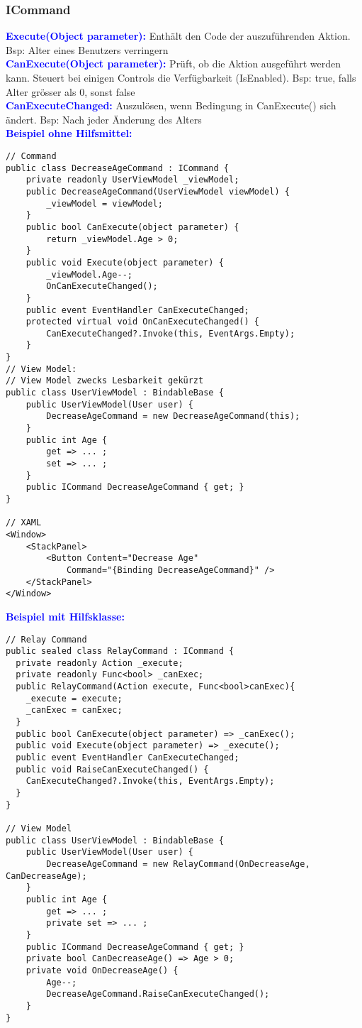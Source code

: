 \subsubsection{ICommand}
\textbf{\textcolor{blue}{Execute(Object parameter):}} Enthält den Code der auszuführenden Aktion. Bsp: Alter eines Benutzers verringern\\
\textbf{\textcolor{blue}{CanExecute(Object parameter):}} Prüft, ob die Aktion ausgeführt werden kann. Steuert bei einigen Controls die Verfügbarkeit (IsEnabled). Bsp: true, falls Alter grösser als 0, sonst false\\
\textbf{\textcolor{blue}{CanExecuteChanged:}} Auszulösen, wenn Bedingung in CanExecute() sich ändert. Bsp: Nach jeder Änderung des Alters\\
\textbf{\textcolor{blue}{Beispiel ohne Hilfsmittel:}}
\begin{lstlisting}
// Command
public class DecreaseAgeCommand : ICommand {
    private readonly UserViewModel _viewModel;
    public DecreaseAgeCommand(UserViewModel viewModel) {
        _viewModel = viewModel;
    }
    public bool CanExecute(object parameter) {
        return _viewModel.Age > 0;
    }
    public void Execute(object parameter) {
        _viewModel.Age--;
        OnCanExecuteChanged();
    }
    public event EventHandler CanExecuteChanged;
    protected virtual void OnCanExecuteChanged() {
        CanExecuteChanged?.Invoke(this, EventArgs.Empty);
    }
}
// View Model:
// View Model zwecks Lesbarkeit gekürzt
public class UserViewModel : BindableBase {
    public UserViewModel(User user) {
        DecreaseAgeCommand = new DecreaseAgeCommand(this);
    }
    public int Age {
        get => ... ;
        set => ... ;
    }
    public ICommand DecreaseAgeCommand { get; }
}

// XAML
<Window>
    <StackPanel>
        <Button Content="Decrease Age"
            Command="{Binding DecreaseAgeCommand}" />
    </StackPanel>
</Window>
\end{lstlisting}
\textbf{\textcolor{blue}{Beispiel mit Hilfsklasse:}}
\begin{lstlisting}
// Relay Command
public sealed class RelayCommand : ICommand {
  private readonly Action _execute;
  private readonly Func<bool> _canExec;
  public RelayCommand(Action execute, Func<bool>canExec){
    _execute = execute;
    _canExec = canExec;
  }
  public bool CanExecute(object parameter) => _canExec();
  public void Execute(object parameter) => _execute();
  public event EventHandler CanExecuteChanged;
  public void RaiseCanExecuteChanged() {
    CanExecuteChanged?.Invoke(this, EventArgs.Empty);
  }
}

// View Model
public class UserViewModel : BindableBase {
    public UserViewModel(User user) {
        DecreaseAgeCommand = new RelayCommand(OnDecreaseAge, CanDecreaseAge);
    }
    public int Age {
        get => ... ;
        private set => ... ;
    }
    public ICommand DecreaseAgeCommand { get; }
    private bool CanDecreaseAge() => Age > 0;
    private void OnDecreaseAge() {
        Age--;
        DecreaseAgeCommand.RaiseCanExecuteChanged();
    }
}
\end{lstlisting}

